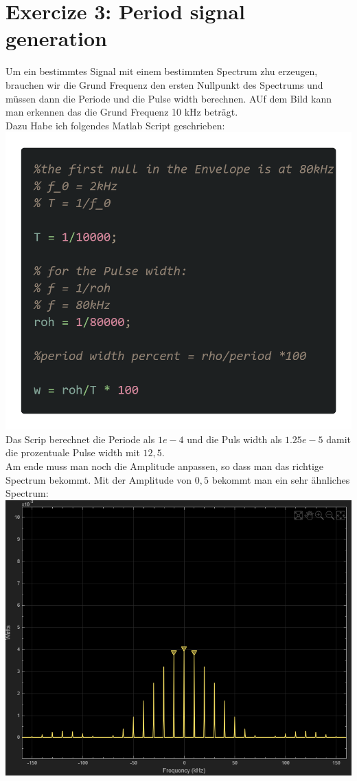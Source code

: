 \documentclass{scrartcl}
\begin{document}
\section*{Exercize 3: Period signal generation}

Um ein bestimmtes Signal mit einem bestimmten Spectrum zhu erzeugen, brauchen wir die Grund Frequenz den ersten Nullpunkt des Spectrums und müssen dann die Periode und die Pulse width berechnen. AUf dem Bild kann man erkennen das die Grund Frequenz 10 kHz beträgt.\\
Dazu Habe ich folgendes Matlab Script geschrieben:\\
\includegraphics[scale=0.3]{codem3.png}\\
Das Scrip berechnet die Periode als $1e-4$ und die Puls width als $1.25e-5$ damit die prozentuale Pulse width mit $12,5$.\\
Am ende muss man noch die Amplitude anpassen, so dass man das richtige Spectrum bekommt. Mit der Amplitude von $0,5$ bekommt man ein sehr ähnliches Spectrum:\\
\includegraphics[scale=0.6]{PulseScopeE3.png}
\end{document}
